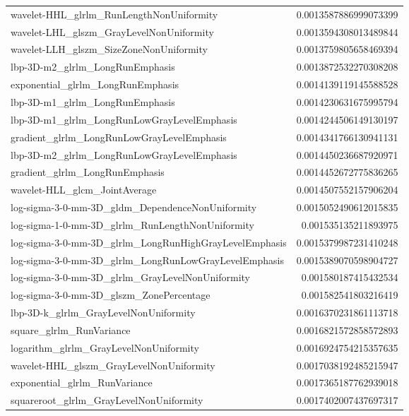 {\begin{xltabular}[H]{\textwidth}{X r}
        wavelet-HHL\_glrlm\_RunLengthNonUniformity & 0.0013587886999073399 \\
        wavelet-LHL\_glszm\_GrayLevelNonUniformity & 0.0013594308013489844 \\
        wavelet-LLH\_glszm\_SizeZoneNonUniformity & 0.0013759805658469394 \\
        lbp-3D-m2\_glrlm\_LongRunEmphasis & 0.0013872532270308208 \\
        exponential\_glrlm\_LongRunEmphasis & 0.0014139119145588528 \\
        lbp-3D-m1\_glrlm\_LongRunEmphasis & 0.0014230631675995794 \\
        lbp-3D-m1\_glrlm\_LongRunLowGrayLevelEmphasis & 0.0014244506149130197 \\
        gradient\_glrlm\_LongRunLowGrayLevelEmphasis & 0.0014341766130941131 \\
        lbp-3D-m2\_glrlm\_LongRunLowGrayLevelEmphasis & 0.0014450236687920971 \\
        gradient\_glrlm\_LongRunEmphasis & 0.0014452672775836265 \\
        wavelet-HLL\_glcm\_JointAverage & 0.0014507552157906204 \\
        log-sigma-3-0-mm-3D\_gldm\_DependenceNonUniformity & 0.0015052490612015835 \\
        log-sigma-1-0-mm-3D\_glrlm\_RunLengthNonUniformity & 0.001535135211893975 \\
        log-sigma-3-0-mm-3D\_glrlm\_LongRunHighGrayLevelEmphasis & 0.0015379987231410248 \\
        log-sigma-3-0-mm-3D\_glrlm\_LongRunLowGrayLevelEmphasis & 0.0015389070598904727 \\
        log-sigma-3-0-mm-3D\_glrlm\_GrayLevelNonUniformity & 0.001580187415432534 \\
        log-sigma-3-0-mm-3D\_glszm\_ZonePercentage & 0.001582541803216419 \\
        lbp-3D-k\_glrlm\_GrayLevelNonUniformity & 0.0016370231861113718 \\
        square\_glrlm\_RunVariance & 0.0016821572858572893 \\
        logarithm\_glrlm\_GrayLevelNonUniformity & 0.0016924754215357635 \\
        wavelet-HHL\_glszm\_GrayLevelNonUniformity & 0.0017038192485215947 \\
        exponential\_glrlm\_RunVariance & 0.0017365187762939018 \\
        squareroot\_glrlm\_GrayLevelNonUniformity & 0.0017402007437697317 \\

\end{xltabular}}
